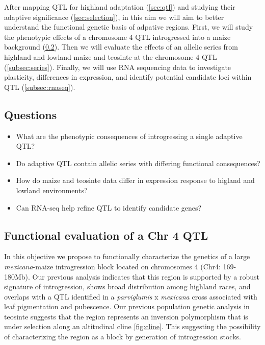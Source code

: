 After mapping QTL for highland adaptation (\ref{sec:qtl}) and studying their adaptive significance (\ref{sec:selection}), in this aim we will aim to better understand the functional genetic basis of adpative regions.  First, we will study the phenotypic effects of a chromosome 4 QTL introgressed into a maize background (\ref{subsec:nils}).  Then we will evaluate the effects of an allelic series from highland and lowland maize and teosinte at the chromosome 4 QTL (\ref{subsec:series}).  Finally, we will use RNA sequencing data to investigate plasticity, differences in expression, and identify potential candidate loci within QTL (\ref{subsec:rnaseq}).

\subsection{Questions}
\begin{itemize}[topsep=0pt,itemsep=-1ex,partopsep=1ex,parsep=1ex]
\item What are the phenotypic consequences of introgressing a single adaptive QTL?
\item Do adaptive QTL contain allelic series with differing functional consequences?
\item How do maize and teosinte data differ in expression response to higland and lowland environments?
\item Can RNA-seq help refine QTL to identify candidate genes?
\end{itemize}

\subsection{Functional evaluation of a Chr 4 QTL} \label{subsec:nils}

In this objective we propose to functionally characterize the genetics of a large \emph{mexicana}-maize introgression block located on chromosomes 4 (Chr4: 169-180Mb). Our previous analysis \citep{Hufford2013} indicates that this region is supported by a robust signature of introgression, shows broad distribution among highland races, and overlaps with a QTL identified in a \emph{parviglumis} x \emph{mexicana} cross  \citep{Lauter2004a} associated with leaf pigmentation and pubescence. Our previous population genetic analysis in teosinte \citep{Pyhajarvi2013}  suggests that the region represents an inversion polymorphism that is under selection along an altitudinal cline \ref{fig:cline}.  This suggesting the possibility of characterizing the region as a block by generation of introgression stocks.

